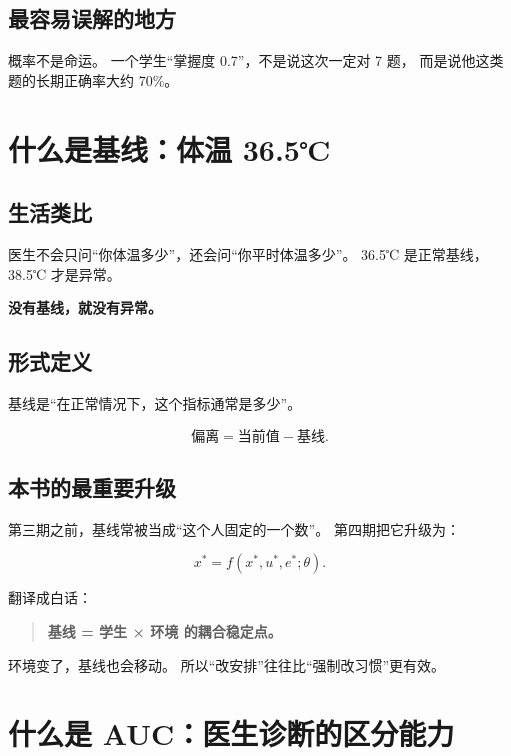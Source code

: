 \documentclass[UTF8,a4paper,11pt]{ctexart}
\begin{document}
\subsection{最容易误解的地方}

概率不是命运。
一个学生“掌握度 0.7”，不是说这次一定对 7 题，
而是说他这类题的长期正确率大约 70\%。


\section{什么是基线：体温 36.5℃}

\subsection{生活类比}

医生不会只问“你体温多少”，还会问“你平时体温多少”。
36.5℃ 是正常基线，38.5℃ 才是异常。

\textbf{没有基线，就没有异常。}

\subsection{形式定义}

基线是“在正常情况下，这个指标通常是多少”。

\begin{equation}
\text{偏离}=\text{当前值}-\text{基线}.
\end{equation}

\subsection{本书的最重要升级}

第三期之前，基线常被当成“这个人固定的一个数”。
第四期把它升级为：

\begin{equation}
x^*=f(x^*,u^*,e^*;\theta).
\end{equation}

翻译成白话：

\begin{quote}
\textbf{基线 = 学生 × 环境 的耦合稳定点。}
\end{quote}

环境变了，基线也会移动。
所以“改安排”往往比“强制改习惯”更有效。


\section{什么是 AUC：医生诊断的区分能力}
\end{document}
